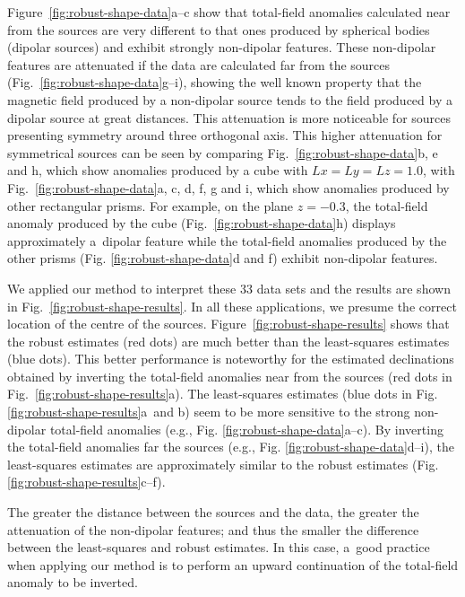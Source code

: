 \documentclass[journal abbreviation, npg]{copernicus}
\begin{document}
Figure~\ref{fig:robust-shape-data}a--c show that total-field anomalies
calculated near from the sources are very different to that ones
produced by spherical bodies (dipolar sources) and exhibit strongly
non-dipolar features. These non-dipolar features are attenuated if the
data are calculated far from the sources
(Fig.~\ref{fig:robust-shape-data}g--i), showing the well known
property that the magnetic field produced by a non-dipolar source
tends to the field produced by a dipolar source at great
distances. This attenuation is more noticeable for sources presenting
symmetry around three orthogonal axis. This higher attenuation for
symmetrical sources can be seen by comparing
Fig.~\ref{fig:robust-shape-data}b, e and h, which show anomalies
produced by a cube with $Lx=Ly=Lz=1.0$, with
Fig.~\ref{fig:robust-shape-data}a, c, d, f, g and i, which show
anomalies produced by other rectangular prisms. For example, on the
plane $z=-0.3$, the total-field anomaly produced by the cube
(Fig.~\ref{fig:robust-shape-data}h) displays approximately a~dipolar
feature while the total-field anomalies produced by the other prisms
(Fig. \ref{fig:robust-shape-data}d and f) exhibit non-dipolar
features.

We applied our method to interpret these 33 data sets and the results
are shown in Fig.~\ref{fig:robust-shape-results}. In all these
applications, we presume the correct location of the centre of the
sources. Figure~\ref{fig:robust-shape-results} shows that the robust
estimates (red dots) are much better than the least-squares estimates
(blue dots). This better performance is noteworthy for the estimated
declinations obtained by inverting the total-field anomalies near from
the sources (red dots in Fig.~\ref{fig:robust-shape-results}a). The
least-squares estimates (blue dots in
Fig. \ref{fig:robust-shape-results}a~and b) seem to be more sensitive
to the strong non-dipolar total-field anomalies (e.g.,
Fig. \ref{fig:robust-shape-data}a--c). By inverting the total-field
anomalies far the sources (e.g.,
Fig. \ref{fig:robust-shape-data}d--i), the least-squares estimates are
approximately similar to the robust estimates
(Fig. \ref{fig:robust-shape-results}c--f).

The greater the distance between the sources and the data, the greater
the attenuation of the non-dipolar features; and thus the smaller the
difference between the least-squares and robust estimates. In this
case, a~good practice when applying our method is to perform an upward
continuation of the total-field anomaly to be inverted.
\end{document}
